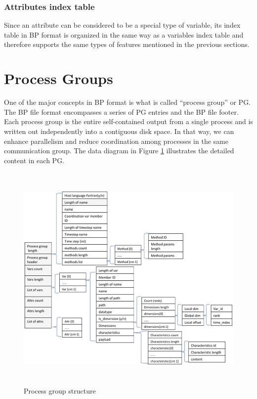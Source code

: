\subsubsection{Attributes index table}

Since an attribute can be considered to be a special type of variable, its index 
table in BP format is organized in the same way as a variables index table and 
therefore supports the same types of features mentioned in the previous sections. 

\section{Process Groups}

One of the major concepts in BP format is what is called ``process group'' or PG. 
The BP file format encompasses a series of PG entries and the BP file footer. Each 
process group is the entire self-contained output from a single process and is 
written out independently into a contiguous disk space. In that way, we can enhance 
parallelism and reduce coordination among processes in the same communication group. 
The data diagram in Figure \ref{fig:process-group-struct} 
illustrates the detailed content in each PG. 

\begin{figure}[htbp]
\begin{center}
\includegraphics[width=389pt, height=321pt]{figures/process-group-structure.png}
\caption{Process group structure}
\label{fig:process-group-struct}
\end{center}
\end{figure}

